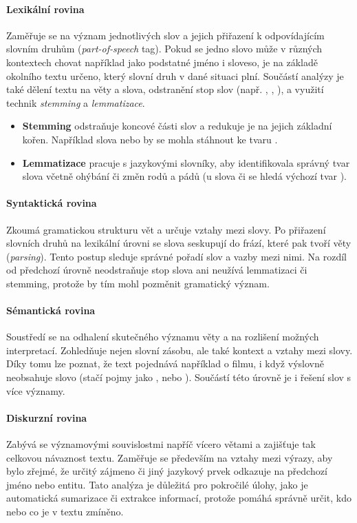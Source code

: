 \paragraph{Lexikální rovina}
Zaměřuje se na význam jednotlivých slov a jejich přiřazení k odpovídajícím slovním druhům (\emph{part-of-speech} tag). Pokud se jedno slovo může v různých kontextech chovat například jako podstatné jméno i sloveso, je na základě okolního textu určeno, který slovní druh v dané situaci plní. Součástí analýzy je také dělení textu na věty a slova, odstranění stop slov (např. , , ), a využití technik \emph{stemming} a \emph{lemmatizace}.
\begin{itemize}
  \item \textbf{Stemming} odstraňuje koncové části slov a redukuje je na jejich základní kořen. Například slova  nebo  by se mohla stáhnout ke tvaru .
  \item \textbf{Lemmatizace} pracuje s jazykovými slovníky, aby identifikovala správný tvar slova včetně ohýbání či změn rodů a pádů (u slova  či  se hledá výchozí tvar ).
\end{itemize}

\paragraph{Syntaktická rovina}
Zkoumá gramatickou strukturu vět a určuje vztahy mezi slovy. Po přiřazení slovních druhů na lexikální úrovni se slova seskupují do frází, které pak tvoří věty (\emph{parsing}). Tento postup sleduje správné pořadí slov a vazby mezi nimi. Na rozdíl od předchozí úrovně neodstraňuje stop slova ani neužívá lemmatizaci či stemming, protože by tím mohl pozměnit gramatický význam.

\paragraph{Sémantická rovina}
Soustředí se na odhalení skutečného významu věty a na rozlišení možných interpretací. Zohledňuje nejen slovní zásobu, ale také kontext a vztahy mezi slovy. Díky tomu lze poznat, že text pojednává například o filmu, i když výslovně neobsahuje slovo  (stačí pojmy jako ,  nebo ). Součástí této úrovně je i řešení slov s více významy.

\paragraph{Diskurzní rovina}
Zabývá se významovými souvislostmi napříč vícero větami a zajišťuje tak celkovou návaznost textu. Zaměřuje se především na vztahy mezi výrazy, aby bylo zřejmé, že určitý zájmeno či jiný jazykový prvek odkazuje na předchozí jméno nebo entitu. Tato analýza je důležitá pro pokročilé úlohy, jako je automatická sumarizace či extrakce informací, protože pomáhá správně určit, kdo nebo co je v textu zmíněno.


